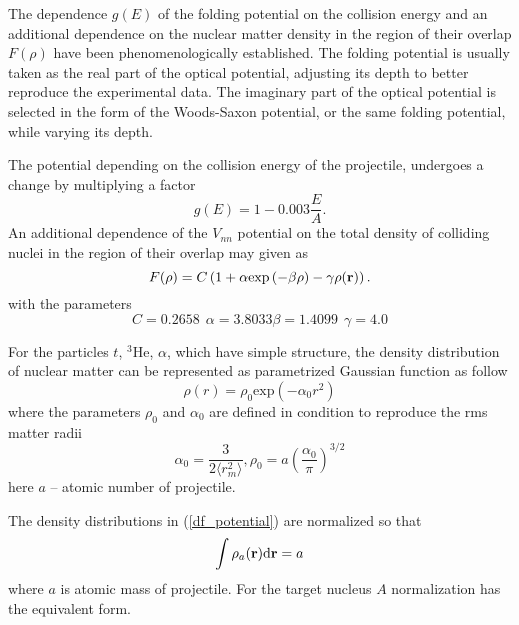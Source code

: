 \documentclass[
12pt, %
oneside, %
english, %
doublespacing, %
doublespacing, %
toctotoc, %
parskip, %
headsepline, %
]{MastersDoctoralThesis} %
\begin{document}
The dependence $g(E)$ of the folding potential on the collision energy and an additional dependence on the nuclear matter density in the region of their overlap $F(\rho)$ have been phenomenologically established. The folding potential is usually taken as the real part of the optical potential, adjusting its depth to better reproduce the experimental data. The imaginary part of the optical potential is selected in the form of the Woods-Saxon potential, or the same folding potential, while varying its depth.

The potential depending on the collision energy of the projectile, undergoes a change by multiplying a factor
\begin{equation}
g(E)= 1-0.003 \frac{E}{A} .
\end{equation}
An additional dependence of the $V_{nn}$ potential on the total density of colliding nuclei in the region of their overlap may given as
\begin{equation}
F(\rho)=C \left( 1+ \alpha \text{exp} \left( - \beta \rho \right) - \gamma \rho({\bf r})\right).
\label{F_dependence}
\end{equation}
with the parameters
\begin{equation}
C=0.2658 ~~ \alpha=3.8033 \beta=1.4099 ~~ \gamma=4.0
\end{equation} 

 For the particles $t$, $^3$He, $\alpha$, which have simple structure, the density distribution of nuclear matter can be represented as parametrized Gaussian function as follow
 \begin{equation}
 \rho \left( r \right) = \rho _0{\mathrm{exp}}\left( - \alpha_0 r^2 \right)
 \end{equation}
 where the parameters $\rho_0$ and $\alpha_0$ are defined in condition to reproduce the rms matter radii
 \begin{equation}
 \alpha_0 = \frac{3}{2\langle r_{m}^{2} \rangle}, 
 \rho_0 = a  \left( \frac{\alpha_0}{\pi} \right)^{3/2}
 \end{equation}
 here $a$ -- atomic number of projectile. 
 
 The density distributions in (\ref{df_potential}) are normalized so that
 \begin{align}
 \int \rho_a ({\bf r}) \text{d} {\bf r}  =a 
 \end{align}
 where $a$ is atomic mass of projectile. For the target nucleus $A$ normalization has the equivalent form.
 
\end{document}
